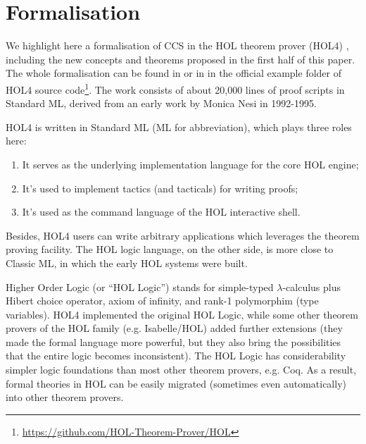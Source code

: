 \section{Formalisation}

We highlight here a formalisation of CCS
in the HOL theorem
prover (HOL4) \cite{slind2008brief},
including the new concepts and theorems proposed in the first half of
this paper.
The whole formalisation can be found 
in \cite{Tian:2017wrba}  or in 
 in the official example folder of HOL4 source
code\footnote{\url{https://github.com/HOL-Theorem-Prover/HOL}}. The
work consists of about 20,000 lines of proof scripts in Standard ML,
derived from an early work \cite{Nesi:1992ve} by Monica Nesi in 1992-1995.

HOL4 is written in Standard ML (ML for abbreviation), which plays three roles here:
\begin{enumerate}
\item It serves as the underlying implementation language for the core HOL engine;
\item It's used to implement tactics (and tacticals) for writing proofs;
\item It's used as the command language of the HOL interactive shell.
\end{enumerate}
Besides, HOL4 users can write arbitrary applications which leverages
the theorem proving facility. The HOL logic language, on the other
side, is more close to Classic ML, in which the early HOL systems were built.

Higher Order Logic (or ``HOL Logic'') \cite{hollogic} stands for simple-typed $\lambda$-calculus plus Hibert
choice operator, axiom of infinity, and rank-1 polymorphim (type
variables). HOL4 implemented the original HOL Logic, while
some other theorem provers of the HOL family (e.g. Isabelle/HOL) added
further extensions (they made the formal language more powerful,
but they also bring the possibilities that the entire logic becomes inconsistent).
The HOL Logic has considerability simpler logic
foundations than most other theorem provers, e.g. Coq. As a result,
formal theories in HOL can be easily migrated (sometimes even
automatically) into other theorem provers.


